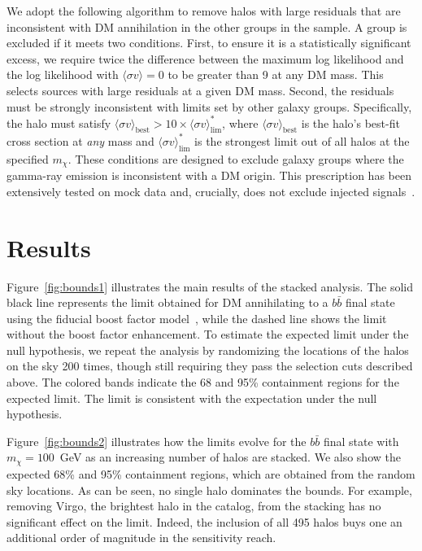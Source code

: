 We adopt the following algorithm to remove halos with large residuals that are inconsistent with DM annihilation in the other groups in the sample. A group is excluded if it meets two conditions. First, to ensure it is a statistically significant excess, we require twice the difference between the maximum log likelihood and the log likelihood with $\langle \sigma v \rangle = 0$ to be greater than 9 at any DM mass. This selects sources with large residuals at a given DM mass.  Second, the residuals must be strongly inconsistent with limits set by other galaxy groups. Specifically, the halo  must satisfy $\langle\sigma v\rangle_\text{best} > 10 \times \langle\sigma v\rangle^*_\text{lim}$, where $\langle\sigma v\rangle_\text{best}$ is the halo's best-fit cross section at \emph{any} mass and $\langle\sigma v\rangle^*_\text{lim}$ is the strongest limit out of all halos at the specified $m_\chi$. These conditions are designed to exclude galaxy groups where the gamma-ray emission is inconsistent with a DM origin.  This prescription has been extensively tested on mock data and, crucially, does not exclude injected signals~\cite{companion}.

\section{Results}

Figure~\ref{fig:bounds1} illustrates the main results of the stacked analysis.  The solid black line represents the limit obtained for DM annihilating to a $b \bar b$ final state using the fiducial boost factor model~\cite{Bartels:2015uba}, while the dashed line  shows the limit without the boost factor enhancement.  To estimate the expected limit under the null hypothesis, we repeat the analysis by randomizing the locations of the halos on the sky 200 times, though still requiring they pass the selection cuts described above.  
The colored bands indicate the 68 and 95\% containment regions for the expected limit.  
The limit is consistent with the expectation under the null hypothesis.

Figure~\ref{fig:bounds2} illustrates how the limits evolve for the $b \bar b$ final state with $m_\chi = 100$~GeV as an increasing number of halos are stacked.  We also show the expected 68\% and 95\% containment regions, which are obtained from the random sky locations.  As can be seen, no single halo dominates the bounds.  For example, removing Virgo, the brightest halo in the catalog, from the stacking has no significant effect on the limit.  Indeed, the inclusion of all 495 halos buys one an additional order of magnitude in the sensitivity reach.

